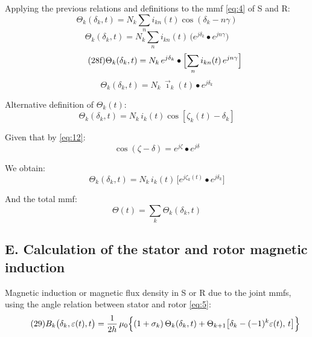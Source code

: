 \documentclass[11pt,a4paper]{article}
\begin{document}
Applying the previous relations and definitions to the mmf \eqref{eq:4} of S and R:
\begin{equation}\tag{28d}\label{eq:28d}
\Theta_k(\delta_k,t) = N_k\sum_n i_{kn}(t)\cos(\delta_k - n\gamma)
\end{equation}
\begin{equation}\tag{28e}\label{eq:28e}
\Theta_k(\delta_k,t) = N_k\sum_n i_{kn}(t)\,\bigl(e^{j\delta_k}\bullet e^{jn\gamma}\bigr)
\end{equation}
\begin{equation}\tag{28f}\label{eq:28f}
\Theta_k(\delta_k,t) = N_k\, e^{j\delta_k}\bullet\Bigl[\sum_n i_{kn}(t)\,e^{jn\gamma}\Bigr]
\end{equation}
\begin{equation}\tag{28g}\label{eq:28g}
\Theta_k(\delta_k,t) = N_k\,\vec\imath_k(t)\bullet e^{j\delta_k}
\end{equation}

Alternative definition of $\Theta_k(t)$:
\begin{equation}\tag{28h}\label{eq:28h}
\Theta_k(\delta_k,t) = N_k\, i_k(t)\cos[\zeta_k(t)-\delta_k]
\end{equation}

Given that by \eqref{eq:12}:
\begin{equation}\tag{28i}\label{eq:28i}
\cos(\zeta-\delta) = e^{j\zeta}\bullet e^{j\delta}
\end{equation}

We obtain:
\begin{equation}\tag{28j}\label{eq:28j}
\Theta_k(\delta_k,t) = N_k\, i_k(t)\,\bigl[e^{j\zeta_k(t)}\bullet e^{j\delta_k}\bigr]
\end{equation}

And the total mmf:
\begin{equation}\tag{28k}\label{eq:28k}
\Theta(t) = \sum_k \Theta_k(\delta_k,t)
\end{equation}

\subsection*{E. Calculation of the stator and rotor magnetic induction}

Magnetic induction or magnetic flux density in S or R due to the joint mmfs, using the angle relation between stator and rotor \eqref{eq:5}:
\begin{equation}\tag{29}\label{eq:29}
B_k\bigl(\delta_k,\varepsilon(t),t\bigr) = \frac{1}{2h}\,\mu_0\Bigl\{(1+\sigma_k)\,\Theta_k(\delta_k,t) + \Theta_{k+1}\bigl[\delta_k - (-1)^k\varepsilon(t),\,t\bigr]\Bigr\}
\end{equation}
\end{document}
